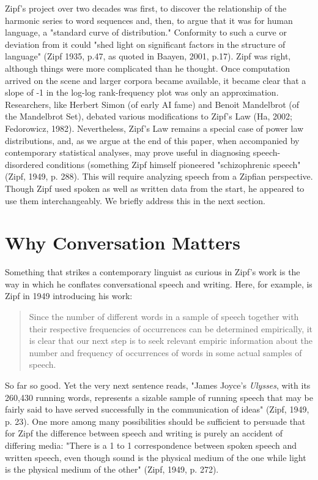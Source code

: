 \documentclass[12pt]{article}
\begin{document}
Zipf's project over two decades was first, to discover the relationship of the harmonic series to word sequences and, then, to argue that it was for human language, a "standard curve of distribution."  Conformity to such a curve or deviation from it could "shed light on significant factors in the structure of language" (Zipf 1935, p.47, as quoted in Baayen, 2001, p.17).  Zipf was right, although things were more complicated than he thought.   Once computation arrived on the scene and larger corpora became available, it became clear that a slope of -1 in the log-log rank-frequency plot was only an approximation.  Researchers, like Herbert Simon (of early AI fame) and Benoit Mandelbrot (of the Mandelbrot Set), debated various modifications to Zipf's Law (Ha, 2002; Fedorowicz, 1982).  Nevertheless, Zipf's Law remains a special case of power law distributions, and, as we argue at the end of this paper, when accompanied by contemporary statistical analyses, may prove useful in diagnosing speech-disordered conditions (something Zipf himself pioneered "schizophrenic speech" (Zipf, 1949, p. 288).  This will require analyzing speech from a Zipfian perspective.  Though Zipf used spoken as well as written data from the start, he appeared to use them interchangeably.  We briefly address this in the next section. 


\section{Why Conversation Matters}
Something that strikes a contemporary linguist as curious in Zipf's work is the way in which he conflates conversational speech and writing.  Here, for example, is Zipf in 1949 introducing his work:
\begin{quote}
Since the number of different words in a sample of speech together with their respective frequencies of occurrences can be determined empirically, it is clear that our next step is to seek relevant empiric information about the number and frequency of occurrences of words in some actual samples of speech.
\end{quote}
So far so good.  Yet the very next sentence reads, "James Joyce's \emph{Ulysses}, with its 260,430 running words, represents a sizable sample of running speech that may be fairly said to have served successfully in the communication of ideas" (Zipf, 1949, p. 23).  One more among many possibilities should be sufficient to persuade that for Zipf the difference between speech and writing is purely an accident of differing media: "There is a 1 to 1 correspondence between spoken speech and written speech, even though sound is the physical medium of the one while light is the physical medium of the other" (Zipf, 1949, p. 272).  
\end{document}
